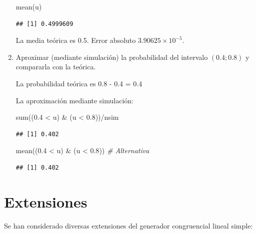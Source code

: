 \documentclass[
]{book}
\newenvironment{Shaded}{\begin{snugshade}}{\end{snugshade}}
\newcommand{\CommentTok}[1]{\textcolor[rgb]{0.56,0.35,0.01}{\textit{#1}}}
\newcommand{\FloatTok}[1]{\textcolor[rgb]{0.00,0.00,0.81}{#1}}
\newcommand{\FunctionTok}[1]{\textcolor[rgb]{0.00,0.00,0.00}{#1}}
\newcommand{\NormalTok}[1]{#1}
\newcommand{\SpecialCharTok}[1]{\textcolor[rgb]{0.00,0.00,0.00}{#1}}
\theoremstyle{break}
\theoremstyle{definition}
\theoremstyle{definition}
\theoremstyle{definition}
\theoremstyle{definition}
\theoremstyle{remark}
\begin{document}
\begin{enumerate}
\begin{Shaded}
\begin{Highlighting}[]
\FunctionTok{mean}\NormalTok{(u)}
\end{Highlighting}
\end{Shaded}

\begin{verbatim}
## [1] 0.4999609
\end{verbatim}

  La media teórica es 0.5.
  Error absoluto \(\ensuremath{3.90625\times 10^{-5}}\).
\item
  Aproximar (mediante simulación) la probabilidad del intervalo
  \((0.4;0.8)\) y compararla con la teórica.

  La probabilidad teórica es 0.8 - 0.4 = 0.4

  La aproximación mediante simulación:

\begin{Shaded}
\begin{Highlighting}[]
\FunctionTok{sum}\NormalTok{((}\FloatTok{0.4} \SpecialCharTok{\textless{}}\NormalTok{ u) }\SpecialCharTok{\&}\NormalTok{ (u }\SpecialCharTok{\textless{}} \FloatTok{0.8}\NormalTok{))}\SpecialCharTok{/}\NormalTok{nsim}
\end{Highlighting}
\end{Shaded}

\begin{verbatim}
## [1] 0.402
\end{verbatim}

\begin{Shaded}
\begin{Highlighting}[]
\FunctionTok{mean}\NormalTok{((}\FloatTok{0.4} \SpecialCharTok{\textless{}}\NormalTok{ u) }\SpecialCharTok{\&}\NormalTok{ (u }\SpecialCharTok{\textless{}} \FloatTok{0.8}\NormalTok{))     }\CommentTok{\# Alternativa}
\end{Highlighting}
\end{Shaded}

\begin{verbatim}
## [1] 0.402
\end{verbatim}
\end{enumerate}

\hypertarget{extensiones}{%
\section{Extensiones}\label{extensiones}}

Se han considerado diversas extensiones del generador congruencial lineal simple:
\end{document}
